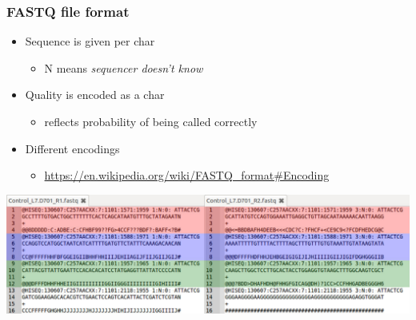 \documentclass{beamer}			  %
\begin{document}
\begin{frame}
	\frametitle{FASTQ file format}
	\begin{itemize}
		\item Sequence is given per char
		\begin{itemize}
			\item N means \textit{sequencer doesn't know}
		\end{itemize}
		\item Quality is encoded as a char
		\begin{itemize}
			\item reflects probability of being called correctly
		\end{itemize}
		\item Different encodings
		\begin{itemize}
			\item {\scriptsize \url{https://en.wikipedia.org/wiki/FASTQ\_format\#Encoding}}
		\end{itemize}
	\end{itemize}
	\begin{center}
		\includegraphics[width=\textwidth]{figures/dge_03bp.png}
	\end{center}
\end{frame}
\end{document}
